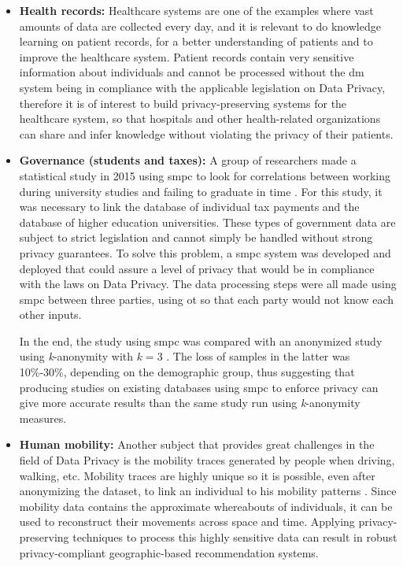\begin{itemize}
	
	\item \textbf{Health records:} Healthcare systems are one of the examples where vast amounts of data are collected every day, and it is relevant to do knowledge learning on patient records, for a better understanding of patients and to improve the healthcare system. Patient records contain very sensitive information about individuals and cannot be processed without the \ac{dm} system being in compliance with the applicable legislation on Data Privacy, therefore it is of interest to build privacy-preserving systems for the healthcare system, so that hospitals and other health-related organizations can share and infer knowledge without violating the privacy of their patients.

	\item \textbf{Governance (students and taxes):} A group of researchers made a statistical study in 2015 using \ac{smpc} to look for correlations between working during university studies and failing to graduate in time \cite{Bogdanov2015}. For this study, it was necessary to link the database of individual tax payments and the database of higher education universities. These types of government data are subject to strict legislation and cannot simply be handled without strong privacy guarantees.
    To solve this problem, a \ac{smpc} system was developed and deployed that could assure a level of privacy that would be in compliance with the laws on Data Privacy. The data processing steps were all made using \ac{smpc} between three parties, using \ac{ot} so that each party would not know each other inputs.
    
    In the end, the study using \ac{smpc} was compared with an anonymized study using \textit{k}-anonymity with $\textit{k}=3$ . The loss of samples in the latter was 10\%-30\%, depending on the demographic group, thus suggesting that producing studies on existing databases using \ac{smpc} to enforce privacy can give more accurate results than the same study run using \textit{k}-anonymity measures.

	\item \textbf{Human mobility:} Another subject that provides great challenges in the field of Data Privacy is the mobility traces generated by people when driving, walking, etc. Mobility traces are highly unique so it is possible, even after anonymizing the dataset, to link an individual to his mobility patterns \cite{de2013unique}. Since mobility data contains the approximate whereabouts of individuals, it can be used to reconstruct their movements across space and time. Applying privacy-preserving techniques to process this highly sensitive data can result in robust privacy-compliant geographic-based recommendation systems.
\end{itemize}


